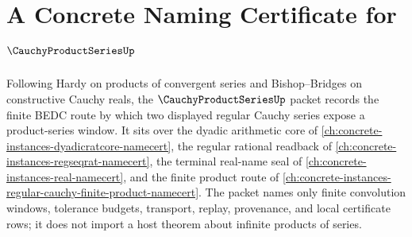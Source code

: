 \chapter{A Concrete Naming Certificate for $\CauchyProductSeriesUp$}
\label{ch:concrete-instances-cauchy-product-series-namecert}

Following Hardy on products of convergent series and Bishop--Bridges on constructive Cauchy reals, the $\CauchyProductSeriesUp$ packet records the finite BEDC route by which two displayed regular Cauchy series expose a product-series window. It sits over the dyadic arithmetic core of \autoref{ch:concrete-instances-dyadicratcore-namecert}, the regular rational readback of \autoref{ch:concrete-instances-regseqrat-namecert}, the terminal real-name seal of \autoref{ch:concrete-instances-real-namecert}, and the finite product route of \autoref{ch:concrete-instances-regular-cauchy-finite-product-namecert}. The packet names only finite convolution windows, tolerance budgets, transport, replay, provenance, and local certificate rows; it does not import a host theorem about infinite products of series.

